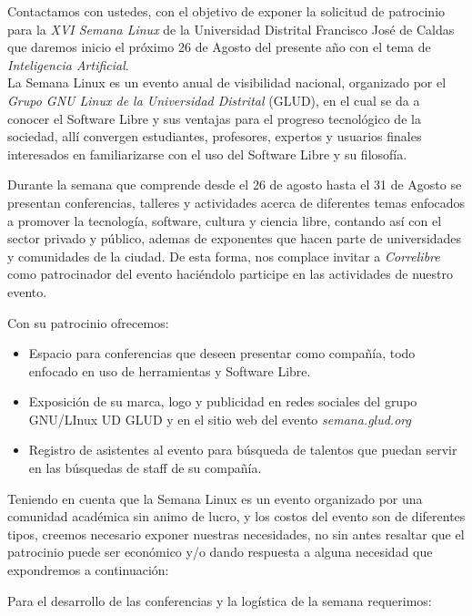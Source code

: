 

 Contactamos con ustedes, con el objetivo de exponer la solicitud de patrocinio para la \textit{XVI Semana Linux} de la Universidad Distrital Francisco Jos\'e de Caldas que daremos inicio el pr\'oximo 26 de Agosto del presente año con el tema de  \textit{Inteligencia Artificial}.  \\ 


La Semana Linux es un evento anual de visibilidad nacional, organizado por el \textit{Grupo GNU Linux de la Universidad Distrital} (GLUD), en el cual se da a conocer el Software Libre y sus ventajas para el progreso tecnol\'ogico de la sociedad, all\'i convergen estudiantes, profesores, expertos y usuarios finales interesados en familiarizarse con el uso del Software Libre y su filosofía.


Durante la semana que comprende desde el 26 de agosto hasta el 31 de Agosto se presentan conferencias, talleres y actividades acerca de diferentes temas enfocados a promover la tecnología, software, cultura y ciencia libre, contando as\'i con el sector privado y p\'ublico, ademas de exponentes que hacen parte de universidades y comunidades de la ciudad.  De esta forma, nos complace invitar a \textit{Correlibre} como patrocinador del evento haci\'endolo participe en las actividades de nuestro evento. 

Con su patrocinio ofrecemos:

\begin{itemize}
    \item Espacio para conferencias que deseen presentar como compañía, todo enfocado en uso de herramientas y Software Libre.
    \item Exposición de su marca, logo y publicidad en redes sociales del grupo GNU/LInux UD  GLUD y en el sitio web del evento \textit{semana.glud.org} 
    \item Registro de asistentes al evento para b\'usqueda de talentos que puedan servir en las b\'usquedas de staff de su compañía.
\end{itemize}


Teniendo en cuenta que la Semana Linux es un evento organizado por una comunidad acad\'emica sin animo de lucro, y los costos del evento son de diferentes tipos, creemos necesario exponer nuestras necesidades, no sin antes resaltar que el patrocinio puede ser económico y/o dando respuesta a alguna necesidad que expondremos a continuación: 


Para el desarrollo de las conferencias y la logística de la  semana requerimos:


